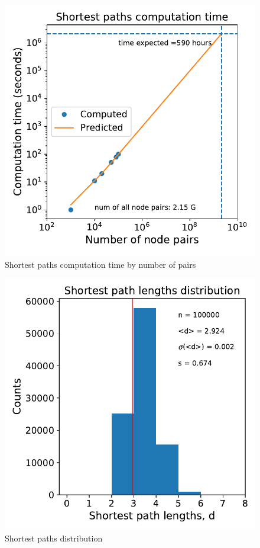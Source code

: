 \documentclass[12pt, twoside]{report}
\begin{document}
    
\begin{minipage}[b]{0.5\textwidth}
   \centering
    \begin{figure}[H]
      \includegraphics[width=\textwidth]{../../scripts/visualization/imgs/paths_computation_time.pdf}            
          \caption{Shortest paths computation time by number of pairs}
      \label{fig:path_time}
\end{figure}
\end{minipage}
\begin{minipage}[b]{0.5\textwidth}
  \begin{figure}[H]
  \centering
      \includegraphics[width=\textwidth]{../../scripts/visualization/imgs/paths_hist.pdf}            
        \caption{Shortest paths distribution}
\end{figure}
\end{minipage}
\end{document}
